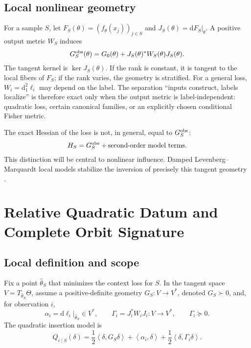 \documentclass[10pt,a4paper]{article}
\newcommand{\Ker}{\operatorname{ker}}
\newcommand{\inner}[2]{\left\langle #1,#2\right\rangle}
\newcommand{\dd}{\mathrm d}
\begin{document}
\subsection{Local nonlinear geometry}
For a sample $S$, let $F_S(\theta)=(f_\theta(x_j))_{j\in S}$ and $J_S(\theta)=\dd F_S|_\theta$. A positive output metric $W_S$ induces
\begin{equation}
G_S^{\rm obs}(\theta)=G_0(\theta)+J_S(\theta)^*W_S(\theta)J_S(\theta).
\end{equation}
The tangent kernel is $\Ker J_S(\theta)$. If the rank is constant, it is tangent to the local fibers of $F_S$; if the rank varies, the geometry is stratified. For a general loss, $W_i=\dd_1^2\ell_i$ may depend on the label. The separation ``inputs construct, labels localize'' is therefore exact only when the output metric is label-independent: quadratic loss, certain canonical families, or an explicitly chosen conditional Fisher metric.

The exact Hessian of the loss is not, in general, equal to $G_S^{\rm obs}$:
\[
H_S=G_S^{\rm obs}+\text{second-order model terms}.
\]
This distinction will be central to nonlinear influence. Damped Levenberg--Marquardt local models stabilize the inversion of precisely this tangent geometry \citep{levenberg1944,marquardt1963,marquardt1970}.

\section{Relative Quadratic Datum and Complete Orbit Signature}
\subsection{Local definition and scope}
Fix a point $\widehat\theta_S$ that minimizes the context loss for $S$. In the tangent space $V=T_{\widehat\theta_S}\Theta$, assume a positive-definite geometry $G_S:V\to V^*$, denoted $G_S\succ0$, and, for observation $i$,
\begin{equation}
\alpha_i=\dd\ell_i|_{\widehat\theta_S}\in V^*,
\qquad
\Gamma_i=J_i^*W_iJ_i:V\to V^*,
\qquad \Gamma_i\succeq0.
\end{equation}
The quadratic insertion model is
\begin{equation}
Q_{i\mid S}(\delta)
=
\frac12\inner{\delta}{G_S\delta}
+
\inner{\alpha_i}{\delta}
+
\frac12\inner{\delta}{\Gamma_i\delta}.
\label{eq:local-quadratic-model}
\end{equation}
\end{document}
